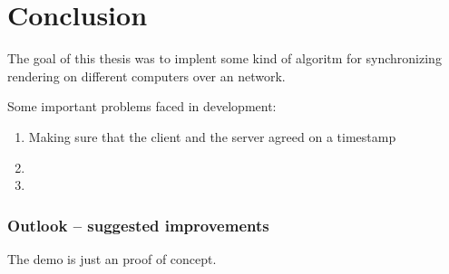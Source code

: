 \chapter{Conclusion}
The goal of this thesis was to implent some kind of algoritm for synchronizing rendering on different computers over an network. 

Some important problems faced in development:
\begin{enumerate}
  \item Making sure that the client and the server agreed on a timestamp
  \item 
  \item 
\end{enumerate}



\subsection*{Outlook -- suggested improvements}
The demo is just an proof of concept.
